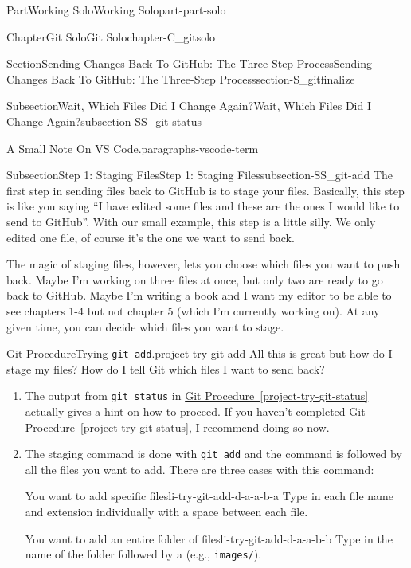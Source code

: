 \documentclass[oneside,10pt,]{book}
\newcommand{\xreffont}{\relax}
\newcommand{\mono}[1]{\texttt{#1}}
\DeclareRobustCommand{\initialismintitle}[1]{\texorpdfstring{#1}{#1}}
\newcommand{\kbd}[1]{\keys{{#1}}}
\begin{document}
\begin{partptx}{Part}{Working Solo}{}{Working Solo}{}{}{part-part-solo}
\begin{chapterptx}{Chapter}{Git Solo}{}{Git Solo}{}{}{chapter-C_gitsolo}
\begin{sectionptx}{Section}{Sending Changes Back To GitHub: The Three-Step Process}{}{Sending Changes Back To GitHub: The Three-Step Process}{}{}{section-S_gitfinalize}
\begin{subsectionptx}{Subsection}{Wait, Which Files Did I Change Again?}{}{Wait, Which Files Did I Change Again?}{}{}{subsection-SS_git-status}
\begin{paragraphs}{A Small Note On \initialismintitle{VS} Code.}{paragraphs-vscode-term}
\end{paragraphs}%
\end{subsectionptx}
%
%
\typeout{************************************************}
\typeout{************************************************}
%
\begin{subsectionptx}{Subsection}{Step 1: Staging Files}{}{Step 1: Staging Files}{}{}{subsection-SS_git-add}
%
%
%
The first step in sending files back to GitHub is to stage your files. Basically, this step is like you saying ``I have edited some files and these are the ones I would like to send to GitHub''. With our small example, this step is a little silly. We only edited one file, of course it's the one we want to send back.%
\par
The magic of staging files, however, lets you choose which files you want to push back. Maybe I'm working on three files at once, but only two are ready to go back to GitHub. Maybe I'm writing a book and I want my editor to be able to see chapters 1-4 but not chapter 5 (which I'm currently working on). At any given time, you can decide which files you want to stage.%
\begin{project}{Git Procedure}{Trying \mono{git add}.}{project-try-git-add}%
All this is great but how do I stage my files? How do I tell Git which files I want to send back?%
\begin{enumerate}[font=\bfseries,label=(\alph*),ref=\alph*]%
\item{}The output from \mono{git status} in \hyperref[project-try-git-status]{Git Procedure~{\xreffont\ref{project-try-git-status}}} actually gives a hint on how to proceed. If you haven't completed \hyperref[project-try-git-status]{Git Procedure~{\xreffont\ref{project-try-git-status}}}, I recommend doing so now.%
\item{}The staging command is done with \mono{git add} and the command is followed by all the files you want to add. There are three cases with this command:%
\begin{descriptionlist}
\begin{dlimedium}{You want to add specific files}{li-try-git-add-d-a-a-b-a}%
Type in each file name and extension individually with a space between each file.%
\end{dlimedium}%
\begin{dlimedium}{You want to add an entire folder of files}{li-try-git-add-d-a-a-b-b}%
Type in the name of the folder followed by a \kbd{/} (e.g.\@, \mono{images/}).%

\end{dlimedium}
\end{descriptionlist}
\end{enumerate}
\end{project}
\end{subsectionptx}
\end{sectionptx}
\end{chapterptx}
\end{partptx}
\end{document}
